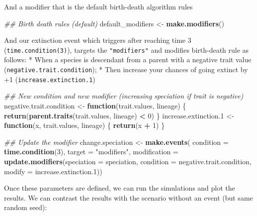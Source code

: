 \documentclass[
]{book}
\newenvironment{Shaded}{\begin{snugshade}}{\end{snugshade}}
\newcommand{\CommentTok}[1]{\textcolor[rgb]{0.56,0.35,0.01}{\textit{#1}}}
\newcommand{\ControlFlowTok}[1]{\textcolor[rgb]{0.13,0.29,0.53}{\textbf{#1}}}
\newcommand{\DataTypeTok}[1]{\textcolor[rgb]{0.13,0.29,0.53}{#1}}
\newcommand{\DecValTok}[1]{\textcolor[rgb]{0.00,0.00,0.81}{#1}}
\newcommand{\FloatTok}[1]{\textcolor[rgb]{0.00,0.00,0.81}{#1}}
\newcommand{\KeywordTok}[1]{\textcolor[rgb]{0.13,0.29,0.53}{\textbf{#1}}}
\newcommand{\NormalTok}[1]{#1}
\newcommand{\OperatorTok}[1]{\textcolor[rgb]{0.81,0.36,0.00}{\textbf{#1}}}
\newcommand{\StringTok}[1]{\textcolor[rgb]{0.31,0.60,0.02}{#1}}
\begin{document}
And a modifier that is the default birth-death algorithm rules

\begin{Shaded}
\begin{Highlighting}[]
\CommentTok{\#\# Birth death rules (default)}
\NormalTok{default\_modifiers \textless{}{-}}\StringTok{ }\KeywordTok{make.modifiers}\NormalTok{()}
\end{Highlighting}
\end{Shaded}

And our extinction event which triggers after reaching time 3 (\texttt{time.condition(3)}), targets the \texttt{"modifiers"} and modifies birth-death rule as follows:
* When a species is descendant from a parent with a negative trait value (\texttt{negative.trait.condition});
* Then increase your chances of going extinct by +1 (\texttt{increase.extinction.1})

\begin{Shaded}
\begin{Highlighting}[]
\CommentTok{\#\# New condition and new modifier (increasing speciation if trait is negative)}
\NormalTok{negative.trait.condition \textless{}{-}}\StringTok{ }\ControlFlowTok{function}\NormalTok{(trait.values, lineage) \{}
    \KeywordTok{return}\NormalTok{(}\KeywordTok{parent.traits}\NormalTok{(trait.values, lineage) }\OperatorTok{\textless{}}\StringTok{ }\DecValTok{0}\NormalTok{)}
\NormalTok{\}}
\NormalTok{increase.extinction}\FloatTok{.1}\NormalTok{ \textless{}{-}}\StringTok{ }\ControlFlowTok{function}\NormalTok{(x, trait.values, lineage) \{}
  \KeywordTok{return}\NormalTok{(x }\OperatorTok{+}\StringTok{ }\DecValTok{1}\NormalTok{)}
\NormalTok{\}}

\CommentTok{\#\# Update the modifier}
\NormalTok{change.speciation \textless{}{-}}\StringTok{ }\KeywordTok{make.events}\NormalTok{(}
    \DataTypeTok{condition    =} \KeywordTok{time.condition}\NormalTok{(}\DecValTok{3}\NormalTok{),}
    \DataTypeTok{target       =} \StringTok{"modifiers"}\NormalTok{,}
    \DataTypeTok{modification =} \KeywordTok{update.modifiers}\NormalTok{(}\DataTypeTok{speciation =}\NormalTok{ speciation,}
                                    \DataTypeTok{condition  =}\NormalTok{ negative.trait.condition,}
                                    \DataTypeTok{modify     =}\NormalTok{ increase.extinction}\FloatTok{.1}\NormalTok{))}
\end{Highlighting}
\end{Shaded}

Once these parameters are defined, we can run the simulations and plot the results.
We can contrast the results with the scenario without an event (but same random seed):
\end{document}
